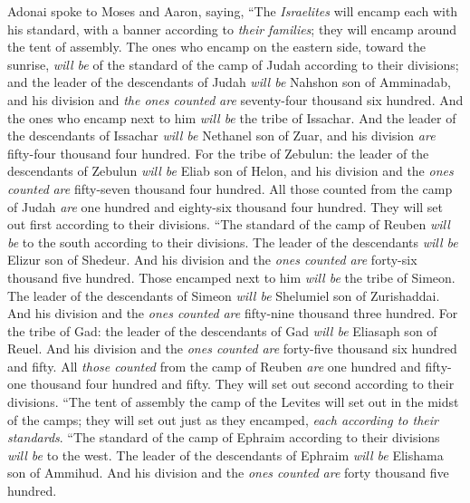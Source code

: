 \begin{biblechapter} %
 Adonai spoke to Moses and Aaron, saying,
\verse “The \textit{Israelites} will encamp each with his standard, with a banner according to \textit{their families}; they will encamp around the tent of assembly.
\verse The ones who encamp on the eastern side, toward the sunrise, \textit{will be} of the standard of the camp of Judah according to their divisions; and the leader of the descendants of Judah \textit{will be} Nahshon son of Amminadab,
\verse and his division and \textit{the ones counted} \textit{are} seventy-four thousand six hundred.
\verse And the ones who encamp next to him \textit{will be} the tribe of Issachar. And the leader of the descendants of Issachar \textit{will be} Nethanel son of Zuar,
\verse and his division \textit{are} fifty-four thousand four hundred.
\verse For the tribe of Zebulun: the leader of the descendants of Zebulun \textit{will be} Eliab son of Helon,
\verse and his division and the \textit{ones counted} \textit{are} fifty-seven thousand four hundred.
\verse All those counted from the camp of Judah \textit{are} one hundred and eighty-six thousand four hundred. They will set out first according to their divisions.
\verse “The standard of the camp of Reuben \textit{will be} to the south according to their divisions. The leader of the descendants \textit{will be} Elizur son of Shedeur.
\verse And his division and the \textit{ones counted} \textit{are} forty-six thousand five hundred.
\verse Those encamped next to him \textit{will be} the tribe of Simeon. The leader of the descendants of Simeon \textit{will be} Shelumiel son of Zurishaddai.
\verse And his division and the \textit{ones counted} \textit{are} fifty-nine thousand three hundred.
\verse For the tribe of Gad: the leader of the descendants of Gad \textit{will be} Eliasaph son of Reuel.
\verse And his division and the \textit{ones counted} \textit{are} forty-five thousand six hundred and fifty.
\verse All \textit{those counted} from the camp of Reuben \textit{are} one hundred and fifty-one thousand four hundred and fifty. They will set out second according to their divisions.
\verse “The tent of assembly the camp of the Levites will set out in the midst of the camps; they will set out just as they encamped, \textit{each according to their standards}.
\verse “The standard of the camp of Ephraim according to their divisions \textit{will be} to the west. The leader of the descendants of Ephraim \textit{will be} Elishama son of Ammihud.
\verse And his division and the \textit{ones counted} \textit{are} forty thousand five hundred.

\end{biblechapter}
